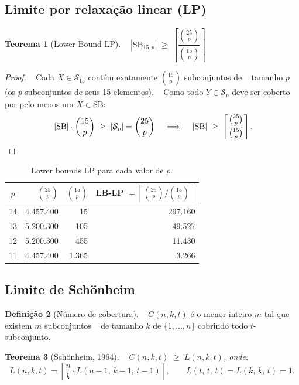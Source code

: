 \documentclass[12pt,a4paper]{article}
\newtheorem{theorem}{Teorema}[section]
\theoremstyle{definition}
\newtheorem{definition}[theorem]{Definição}
\newcommand{\C}[2]{\binom{#1}{#2}}
\newcommand{\SB}{\mathrm{SB}}
\begin{document}
\subsection{Limite por relaxação linear (LP)}

\begin{theorem}[Lower Bound LP]\label{thm:lb-lp}
  $|\SB_{15,p}| \;\geq\; \left\lceil \dfrac{\C{25}{p}}{\C{15}{p}} \right\rceil$
\end{theorem}

\begin{proof}
  Cada $X \in \mathcal{S}_{15}$ contém exatamente $\C{15}{p}$ subconjuntos de
  tamanho $p$ (os $p$-subconjuntos de seus 15 elementos).
  Como todo $Y \in \mathcal{S}_p$ deve ser coberto por pelo menos um $X \in \SB$:
  \[
    |\SB| \cdot \C{15}{p} \;\geq\; |\mathcal{S}_p| = \C{25}{p}
    \;\implies\;
    |\SB| \;\geq\; \left\lceil \frac{\C{25}{p}}{\C{15}{p}} \right\rceil. \qedhere
  \]
\end{proof}

\begin{table}[H]
\centering
\caption{Lower bounds LP para cada valor de $p$.}
\begin{tabular}{crrr}
\toprule
$p$ & $\C{25}{p}$ & $\C{15}{p}$ & LB-LP $= \left\lceil \C{25}{p}/\C{15}{p} \right\rceil$ \\
\midrule
14 & 4.457.400 & 15 & 297.160 \\
13 & 5.200.300 & 105 & 49.527 \\
12 & 5.200.300 & 455 & 11.430 \\
11 & 4.457.400 & 1.365 & 3.266 \\
\bottomrule
\end{tabular}
\end{table}

\subsection{Limite de Schönheim}

\begin{definition}[Número de cobertura]
  $C(n, k, t)$ é o menor inteiro $m$ tal que existem $m$ subconjuntos
  de tamanho $k$ de $\{1,\ldots,n\}$ cobrindo todo $t$-subconjunto.
\end{definition}

\begin{theorem}[Schönheim, 1964]\label{thm:schoenheim}
  $C(n, k, t) \;\geq\; L(n, k, t)$, onde:
  \[
    L(n, k, t) = \left\lceil \frac{n}{k} \cdot L(n-1,\, k-1,\, t-1) \right\rceil,
    \qquad L(t,\, t,\, t) = L(k,\, k,\, t) = 1.
  \]
\end{theorem}
\end{document}
